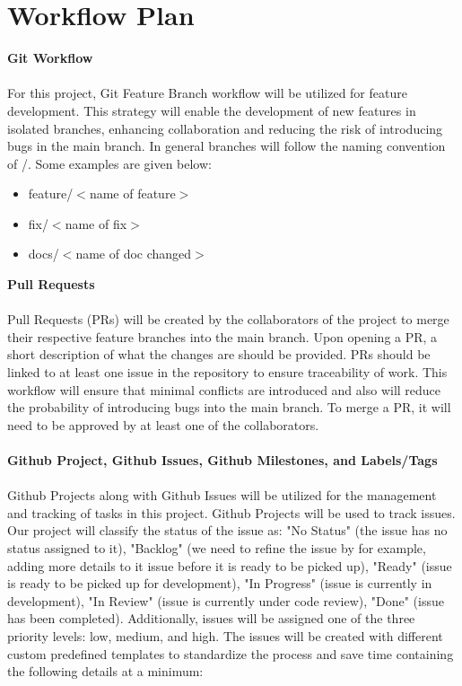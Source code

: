\documentclass{article}
\begin{document}
\section{Workflow Plan}
\textbf{Git Workflow}\\
\\
For this project, Git Feature Branch workflow will be utilized for feature development. This strategy will enable
the development of new features in isolated branches, enhancing collaboration and reducing the risk of
introducing bugs in the main branch. In general branches will follow the naming convention of /. Some
examples are given below:
\begin{itemize}
  \item feature/$<$name of feature$>$
  \item fix/$<$name of fix$>$
  \item docs/$<$name of doc changed$>$
\end{itemize}
\textbf{Pull Requests}\\
\\
Pull Requests (PRs) will be created by the collaborators of the project to merge their respective feature
branches into the main branch. Upon opening a PR, a short description of what the changes are should be
provided. PRs should be linked to at least one issue in the repository to ensure traceability of work. This
workflow will ensure that minimal conflicts are introduced and also will reduce the probability of introducing
bugs into the main branch. To merge a PR, it will need to be approved by at least one of the collaborators.\\
\\
\textbf{Github Project, Github Issues, Github Milestones, and Labels/Tags}\\
\\
Github Projects along with Github Issues will be utilized for the management and tracking of tasks in this
project. Github Projects will be used to track issues. Our project will classify the status of the issue as: "No
Status" (the issue has no status assigned to it), "Backlog" (we need to refine the issue by for example, adding
more details to it issue before it is ready to be picked up), "Ready" (issue is ready to be picked up for
development), "In Progress" (issue is currently in development), "In Review" (issue is currently under code
review), "Done" (issue has been completed). Additionally, issues will be assigned one of the three priority
levels: low, medium, and high. The issues will be created with different custom predefined templates to
standardize the process and save time containing the following details at a minimum:
\end{document}
